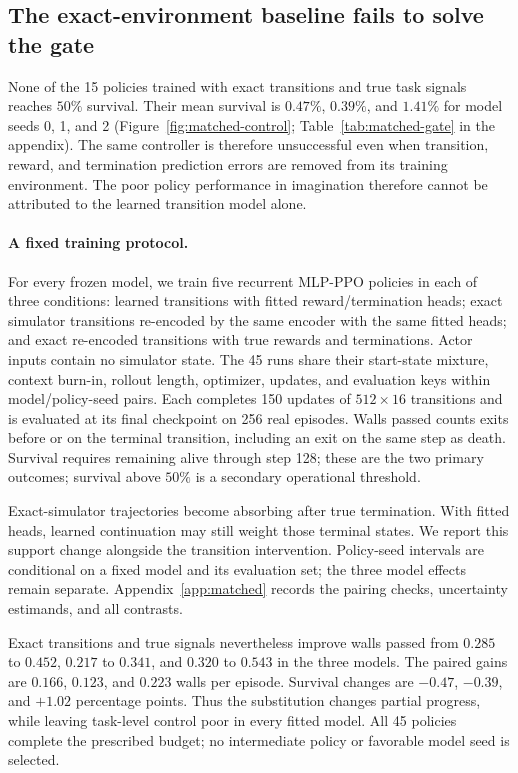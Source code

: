 \subsection{The exact-environment baseline fails to solve the gate}
\label{sec:results-ppo}
\label{sec:results}

None of the 15 policies trained with exact transitions and true task signals reaches $50\%$ survival.
Their mean survival is $0.47\%$, $0.39\%$, and $1.41\%$ for model seeds 0, 1, and 2
(Figure~\ref{fig:matched-control}; Table~\ref{tab:matched-gate} in the appendix). The same controller is therefore unsuccessful even when transition,
reward, and termination prediction errors are removed from its training environment. The poor policy performance in imagination therefore cannot be attributed to the learned transition
model alone.

\paragraph{A fixed training protocol.}
For every frozen model, we train five recurrent MLP-PPO policies \citep{schulman2017ppo} in each of
three conditions: learned transitions with fitted reward/termination heads; exact simulator
transitions re-encoded by the same encoder with the same fitted heads; and exact re-encoded
transitions with true rewards and terminations. Actor inputs contain no simulator state. The 45 runs
share their start-state mixture, context burn-in, rollout length, optimizer, updates, and evaluation
keys within model/policy-seed pairs. Each completes 150 updates of $512\times16$ transitions and is
evaluated at its final checkpoint on 256 real episodes. Walls passed counts exits before or on
the terminal transition, including an exit on the same step as death. Survival requires remaining
alive through step 128; these are the two primary outcomes;
survival above $50\%$ is a secondary operational threshold.

Exact-simulator trajectories become absorbing after true termination. With fitted heads, learned
continuation may still weight those terminal states. We report this support change alongside the
transition intervention. Policy-seed intervals are conditional on a fixed model and its evaluation
set; the three model effects remain separate. Appendix~\ref{app:matched} records the pairing checks,
uncertainty estimands, and all contrasts.

Exact transitions and true signals nevertheless improve walls passed from $0.285$ to $0.452$,
$0.217$ to $0.341$, and $0.320$ to $0.543$ in the three models. The paired gains are $0.166$,
$0.123$, and $0.223$ walls per episode. Survival changes are $-0.47$, $-0.39$, and $+1.02$
percentage points. Thus the substitution changes partial progress, while leaving task-level control
poor in every fitted model. All 45 policies complete the prescribed budget; no intermediate policy
or favorable model seed is selected.

